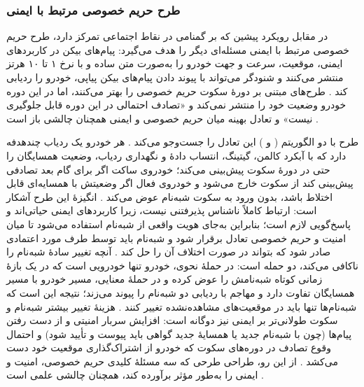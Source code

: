 \documentclass[12pt,a4paper]{article}
\begin{document}
\subsubsection{طرح حریم خصوصی مرتبط با ایمنی }

در مقابل رویکرد پیشین که بر گمنامی در نقاط اجتماعی تمرکز دارد، طرح حریم خصوصی مرتبط با ایمنی  مسئله‌ای دیگر را هدف می‌گیرد: پیام‌های بیکن در کاربرد‌های ایمنی، موقعیت، سرعت و جهت خودرو را به‌صورت متن ساده و با نرخ ۱ تا ۱۰ هرتز منتشر می‌کنند و شنودگر می‌تواند با پیوند دادن پیام‌های بیکن پیاپی، خودرو را ردیابی کند \cite{al-aniPrivacySafetyImprovement2023}. طرح‌های مبتنی بر دورهٔ سکوت حریم خصوصی را بهتر می‌کنند، اما در این دوره خودرو وضعیت خود را منتشر نمی‌کند و «تصادف احتمالی در این دوره قابل جلوگیری نیست» و تعادل بهینه میان حریم خصوصی و ایمنی همچنان چالشی باز است \cite{al-aniPrivacySafetyImprovement2023}.

طرح  با دو الگوریتم ( و ) این تعادل را جست‌وجو می‌کند \cite{al-aniPrivacySafetyImprovement2023}. هر خودرو یک ردیاب چندهدفه  دارد که با آبکرد کالمن، گیتینگ، انتساب دادهٔ  و نگهداری ردیاب، وضعیت همسایگان را حتی در دورهٔ سکوت پیش‌بینی می‌کند؛ خودروی ساکت اگر برای گام بعد تصادفی پیش‌بینی کند از سکوت خارج می‌شود و خودروی فعال اگر وضعیتش با همسایه‌ای قابل اختلاط باشد، بدون ورود به سکوت شبه‌نام عوض می‌کند \cite{al-aniPrivacySafetyImprovement2023}. انگیزهٔ این طرح آشکار است: ارتباط کاملاً ناشناس پذیرفتنی نیست، زیرا کاربرد‌های ایمنی حیاتی‌اند و پاسخ‌گویی لازم است؛ بنابراین به‌جای هویت واقعی از شبه‌نام استفاده می‌شود تا میان امنیت و حریم خصوصی تعادل برقرار شود و شبه‌نام باید توسط طرف مورد اعتمادی صادر شود که بتواند در صورت اختلاف آن را حل کند \cite{al-aniPrivacySafetyImprovement2023}. آنچه تغییر سادهٔ شبه‌نام را ناکافی می‌کند، دو حمله است: در حملهٔ نحوی، خودرو تنها خودرویی است که در یک بازهٔ زمانی کوتاه شبه‌نامش را عوض کرده و در حملهٔ معنایی، مسیر خودرو با مسیر همسایگان تفاوت دارد و مهاجم با ردیابی دو شبه‌نام را پیوند می‌زند؛ نتیجه این است که شبه‌نام‌ها تنها باید در موقعیت‌های مشاهده‌نشده تغییر کنند \cite{al-aniPrivacySafetyImprovement2023}. هزینهٔ تغییر بیشتر شبه‌نام و سکوت طولانی‌تر بر ایمنی نیز دوگانه است: افزایش سربار امنیتی و از دست رفتن پیام‌ها (چون با شبه‌نام جدید یا همسایهٔ جدید گواهی باید پیوست و تأیید شود) و احتمال وقوع تصادف در دوره‌های سکوت که خودرو از اشتراک‌گذاری موقعیت خود دست می‌کشد \cite{al-aniPrivacySafetyImprovement2023}. از این رو، طراحی طرحی که سه مسئلهٔ کلیدی حریم خصوصی، امنیت و ایمنی را به‌طور مؤثر برآورده کند، همچنان چالشی علمی است \cite{al-aniPrivacySafetyImprovement2023}.
\end{document}
